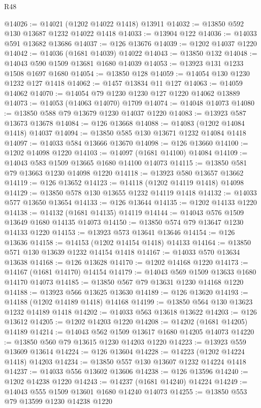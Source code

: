 \begin{lexlean}{R48}
\begin{coremodule}
@14026 := @14021 (@1202 @14022 @1418) @13911
@14032 := @13850 @592 @130 @13687 @1232 @14022 @1418
@14033 := @13904 @122
@14036 := @14033 @591 @13682 @13686
@14037 := @126 @13676
@14039 := @1202 @14037 @1220
@14042 := @14036 (@1681 @14039) @14022
@14043 := @13850 @132
@14048 := @14043 @590 @1509 @13681 @1680 @14039
@14053 := @13923 @131 @1233 @1508 @1697 @1680
@14054 := @13850 @128
@14059 := @14054 @130 @1230 @1232 @127 @1418
@14062 := @1457 @13834 @11 @127
@14063 := @14059 @14062
@14070 := @14054 @79 @1230 @1230 @127 @1220 @14062 @13889
@14073 := @14053 (@14063 @14070) @1709
@14074 := @14048 @14073
@14080 := @13850 @588 @79 @13679 @1230 @14037 @1220
@14083 := @13923 @587 @13673 @13678
@14084 := @126 @13668
@14088 := @14083 (@1202 @14084 @1418) @14037
@14094 := @13850 @585 @130 @13671 @1232 @14084 @1418
@14097 := @14033 @584 @13666 @13670
@14098 := @126 @13660
@14100 := @1202 @14098 @1220
@14103 := @14097 (@1681 @14100) @14084
@14109 := @14043 @583 @1509 @13665 @1680 @14100 @14073
@14115 := @13850 @581 @79 @13663 @1230 @14098 @1220
@14118 := @13923 @580 @13657 @13662
@14119 := @126 @13652
@14123 := @14118 (@1202 @14119 @1418) @14098
@14129 := @13850 @578 @130 @13655 @1232 @14119 @1418
@14132 := @14033 @577 @13650 @13654
@14133 := @126 @13644
@14135 := @1202 @14133 @1220
@14138 := @14132 (@1681 @14135) @14119
@14144 := @14043 @576 @1509 @13649 @1680 @14135 @14073
@14150 := @13850 @574 @79 @13647 @1230 @14133 @1220
@14153 := @13923 @573 @13641 @13646
@14154 := @126 @13636
@14158 := @14153 (@1202 @14154 @1418) @14133
@14164 := @13850 @571 @130 @13639 @1232 @14154 @1418
@14167 := @14033 @570 @13634 @13638
@14168 := @126 @13628
@14170 := @1202 @14168 @1220
@14173 := @14167 (@1681 @14170) @14154
@14179 := @14043 @569 @1509 @13633 @1680 @14170 @14073
@14185 := @13850 @567 @79 @13631 @1230 @14168 @1220
@14188 := @13923 @566 @13625 @13630
@14189 := @126 @13620
@14193 := @14188 (@1202 @14189 @1418) @14168
@14199 := @13850 @564 @130 @13623 @1232 @14189 @1418
@14202 := @14033 @563 @13618 @13622
@14203 := @126 @13612
@14205 := @1202 @14203 @1220
@14208 := @14202 (@1681 @14205) @14189
@14214 := @14043 @562 @1509 @13617 @1680 @14205 @14073
@14220 := @13850 @560 @79 @13615 @1230 @14203 @1220
@14223 := @13923 @559 @13609 @13614
@14224 := @126 @13604
@14228 := @14223 (@1202 @14224 @1418) @14203
@14234 := @13850 @557 @130 @13607 @1232 @14224 @1418
@14237 := @14033 @556 @13602 @13606
@14238 := @126 @13596
@14240 := @1202 @14238 @1220
@14243 := @14237 (@1681 @14240) @14224
@14249 := @14043 @555 @1509 @13601 @1680 @14240 @14073
@14255 := @13850 @553 @79 @13599 @1230 @14238 @1220

\end{coremodule}
\end{lexlean}
